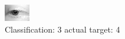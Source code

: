 \begin{figure}[h!]
\begin{center}
\includegraphics[width=0.60\columnwidth]{figures/ID2641_class_3_target_4.png}
\end{center}
\caption{ Classification: 3 actual target: 4}
\label{fig:ID2641_class_3_target_4}
\end{figure}
